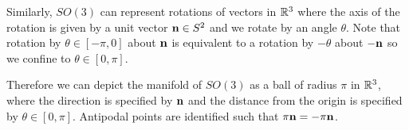 Similarly, $SO \left( 3 \right) $ can represent rotations of vectors in $\mathbb{R}^{3}$ where the axis of the rotation is given by a unit vector $\vb{n} \in S^2$ and we rotate by an angle $\theta$. Note that rotation by $\theta \in \left[ -\pi,0 \right] $ about $\vb{n}$ is equivalent to a rotation by $- \theta$ about $-\vb{n}$ so we confine to $\theta \in \left[ 0,\pi \right] $.

Therefore we can depict the manifold of $SO \left( 3 \right) $ as a ball of radius $\pi$ in $\mathbb{R}^{3}$, where the direction is specified by $\vb{n}$ and the distance from the origin is specified by $\theta \in \left[ 0,\pi \right] $. Antipodal points are identified such that $\pi \vb{n} = - \pi \vb{n}$.

